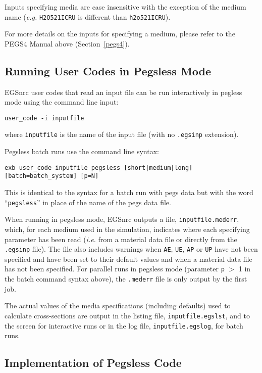 Inputs specifying media are case insensitive with the exception of the medium name ({\it e.g.} {\tt H2O521ICRU} is
different than {\tt h2o521ICRU}).

For more details on the inputs for specifying a medium, please refer to the PEGS4 Manual above (Section~\ref{pegs4}).

\subsection {Running User Codes in Pegsless Mode}

EGSnrc user codes that read an input file can be run interactively in pegless mode using the command line input:
\begin{verbatim}
user_code -i inputfile
\end{verbatim}
where {\tt inputfile} is the name of the input file (with no
{\tt .egsinp} extension).

Pegsless batch runs use the command line syntax:
\begin{verbatim}
exb user_code inputfile pegsless [short|medium|long] [batch=batch_system] [p=N]
\end{verbatim}
This is identical to the syntax for a batch run with pegs data but
with the word ``{\tt pegsless}'' in place of the name of the pegs data file.

When running in pegsless mode, EGSnrc outputs a file, {\tt inputfile.mederr}, which, for each medium used
in the simulation, indicates where each specifying parameter has been read ({\it i.e.} from a material data
file or directly from the {\tt .egsinp} file).  The file also includes warnings when {\tt AE}, {\tt UE},
{\tt AP} or {\tt UP} have not been specified and have been set to their default values and when a material
data file has not been specified.  For parallel runs in pegsless mode (parameter {\tt p} $>$ 1 in the batch
command syntax above), the {\tt .mederr} file is only output by the first job.

The actual values of the media specifications (including defaults) used to calculate cross-sections are
output in the listing file, {\tt inputfile.egslst}, and to the screen for interactive runs or in the
log file, {\tt inputfile.egslog}, for batch runs.

\subsection{Implementation of Pegsless Code}

